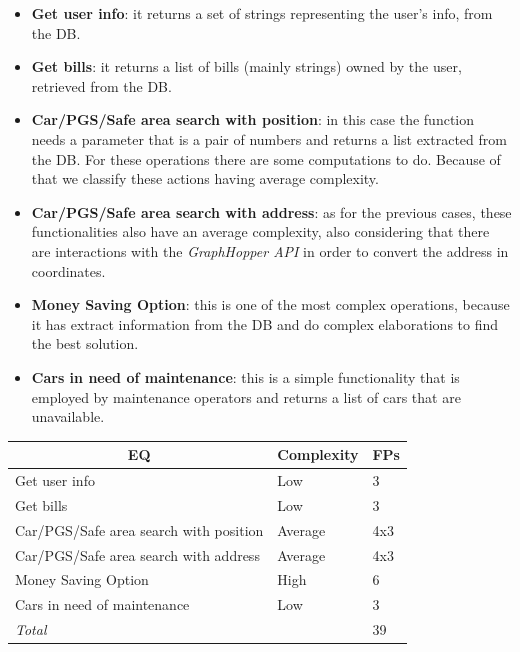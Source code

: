 \documentclass[english]{article}
\begin{document}
\begin{itemize}
	\item{\textbf{Get user info}: it returns a set of strings representing the user's info, from the DB.}

	\item{\textbf{Get bills}: it returns a list of bills (mainly strings) owned by the user, retrieved from the DB.}

	\item{\textbf{Car/PGS/Safe area search with position}: in this case the function needs a parameter that is a pair of numbers and returns a list extracted from the DB. For these operations there are some computations to do. Because of that we classify these actions having average complexity.}

	\item{\textbf{Car/PGS/Safe area search with address}: as for the previous cases, these functionalities also have an average complexity, also considering that there are interactions with the \textit{GraphHopper API} in order to convert the address in coordinates.}

	\item{\textbf{Money Saving Option}: this is one of the most complex operations, because it has extract information from the DB and do complex elaborations to find the best solution.}

	\item{\textbf{Cars in need of maintenance}: this is a simple functionality that is employed by maintenance operators and returns a list of cars that are unavailable.}
\end{itemize}


\begin{center}
	\begin{tabular}{ |p{8cm}|m{2cm}|p{1cm}| }
		\hline
		\multicolumn{1}{|c|}{\textbf{EQ}} & \multicolumn{1}{c|}{\textbf{Complexity}} & \multicolumn{1}{c|}{\textbf{FPs}} \\
		\hline
		Get user info & Low & 3 \\
		\hline
		Get bills & Low & 3\\
		\hline
		Car/PGS/Safe area search with position & Average & 4x3\\
		\hline
		Car/PGS/Safe area search with address & Average & 4x3\\
		\hline
		Money Saving Option & High & 6\\
		\hline
		Cars in need of maintenance & Low & 3 \\
		\hline
		\multicolumn{2}{|l|}{\textit{Total}} & \multicolumn{1}{l|}{39}\\
		\hline
	\end{tabular}
\end{center}
\end{document}
